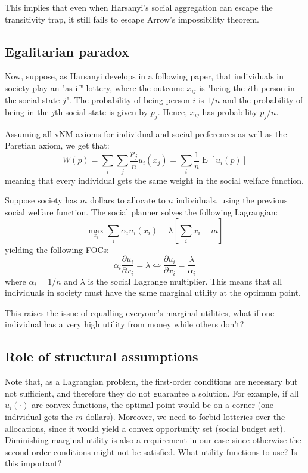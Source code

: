 \documentclass[12pt]{report}
\newcommand{\E}[1]{\operatorname{E}\left[#1\right]}
\begin{document}
This implies that even when Harsanyi's social aggregation can escape the transitivity trap, it still fails to escape Arrow's impossibility theorem.

\subsection{Egalitarian paradox}

Now, suppose, as Harsanyi develops in a following paper, that individuals in society play an "as-if" lottery, where the outcome $x_{ij}$ is "being the $i$th person in the social state $j$". The probability of being person $i$ is $1/n$ and the probability of being in the $j$th social state is given by $p_j$. Hence, $x_{ij}$ has probability $p_j/n$.

Assuming all vNM axioms for individual and social preferences as well as the Paretian axiom, we get that: $$W(p) = \sum_i \sum_j \frac{p_j}{n} u_i(x_{j}) = \sum_i \frac{1}{n} \E{u_i(p)} $$ meaning that every individual gets the same weight in the social welfare function.

Suppose society has $m$ dollars to allocate to $n$ individuals, using the previous social welfare function. The social planner solves the following Lagrangian: $$\max_{x_i} \sum_i \alpha_i u_i(x_i) - \lambda\left[\sum_i x_i - m\right] $$ yielding the following FOCs: $$\alpha_i \frac{\partial u_i}{\partial x_i} = \lambda \Leftrightarrow \frac{\partial u_i}{\partial x_i} = \frac{\lambda}{\alpha_i}$$ where $\alpha_i = 1/n$ and $\lambda$ is the social Lagrange multiplier. This means that all individuals in society must have the same marginal utility at the optimum point.

This raises the issue of equalling everyone's marginal utilities, what if one individual has a very high utility from money while others don't?

\subsection{Role of structural assumptions}

Note that, as a Lagrangian problem, the first-order conditions are necessary but not sufficient, and therefore they do not guarantee a solution. For example, if all $u_i(\cdot)$ are convex functions, the optimal point would be on a corner (one individual gets the $m$ dollars). Moreover, we need to forbid lotteries over the allocations, since it would yield a convex opportunity set (social budget set). Diminishing marginal utility is also a requirement in our case since otherwise the second-order conditions might not be satisfied. What utility functions to use? Is this important?
\end{document}
